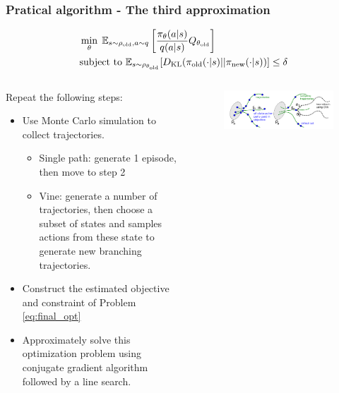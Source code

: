 \documentclass[9pt]{beamer}
\theoremstyle{remark}
\begin{document}
\begin{frame}
    \frametitle{Pratical algorithm - The third approximation}
    \begin{equation}
        \label{eq:final_opt}
    \begin{aligned}
        &\min_{\theta} \; \mathbb{E}_{s \sim \rho_{\rm old}, a \sim q} \left[  \dfrac{\pi_{\theta}(a|s)}{q(a|s)}Q_{\theta_{\rm old}}\right] \\
        &\text{subject to } \mathbb{E}_{s \sim \rho_{\theta_{\rm old}}} [D_{\rm KL}(\pi_{\rm old}( \cdot| s ) || \pi_{\rm new}( \cdot| s ))] \leq \delta
    \end{aligned}
    \end{equation}
    \begin{columns}
        \begin{column}{0.7\textwidth}
    Repeat the following steps:
    \begin{itemize}
        \item Use Monte Carlo simulation to collect trajectories.
            \begin{itemize}
                \item Single path: generate 1 episode, then move to step 2
                \item Vine: generate a number of trajectories, then choose a subset of states and samples actions from these state to generate new branching trajectories.
            \end{itemize}
        \item Construct the estimated objective and constraint of Problem \eqref{eq:final_opt}
        \item Approximately solve this optimization problem using conjugate gradient algorithm followed by a line search.
    \end{itemize}
        \end{column}
        
        \begin{column}{0.3\textwidth}
            \begin{figure}
                \centering
                \includegraphics[width=1.2\textwidth]{figures/mc.png}
            \end{figure}
        \end{column}
    \end{columns}
\end{frame}
\end{document}
